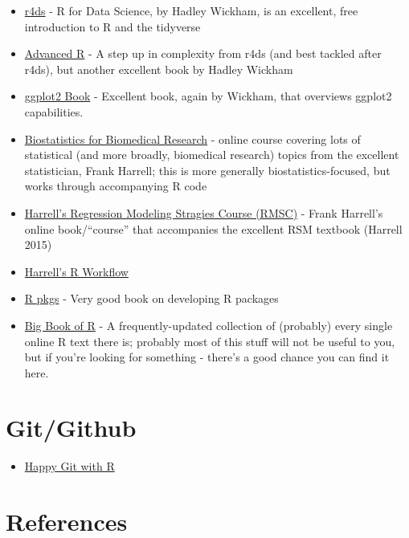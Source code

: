 \documentclass[
  letterpaper,
  DIV=11,
  numbers=noendperiod]{scrreprt}
\providecommand{\tightlist}{%
  \setlength{\itemsep}{0pt}\setlength{\parskip}{0pt}}\usepackage{longtable,booktabs,array}
\begin{document}
\begin{itemize}
\item
  \href{https://r4ds.hadley.nz/}{r4ds} - R for Data Science, by Hadley
  Wickham, is an excellent, free introduction to R and the tidyverse
\item
  \href{https://adv-r.hadley.nz/}{Advanced R} - A step up in complexity
  from r4ds (and best tackled after r4ds), but another excellent book by
  Hadley Wickham
\item
  \href{https://ggplot2-book.org/}{ggplot2 Book} - Excellent book, again
  by Wickham, that overviews ggplot2 capabilities.
\item
  \href{https://hbiostat.org/bbrc/}{Biostatistics for Biomedical
  Research} - online course covering lots of statistical (and more
  broadly, biomedical research) topics from the excellent statistician,
  Frank Harrell; this is more generally biostatistics-focused, but works
  through accompanying R code
\item
  \href{https://hbiostat.org/rmsc/}{Harrell's Regression Modeling
  Stragies Course (RMSC)} - Frank Harrell's online book/``course'' that
  accompanies the excellent RSM textbook (Harrell 2015)
\item
  \href{https://www.fharrell.com/post/rflow/}{Harrell's R Workflow}
\item
  \href{https://r-pkgs.org/}{R pkgs} - Very good book on developing R
  packages
\item
  \href{https://www.bigbookofr.com/}{Big Book of R} - A
  frequently-updated collection of (probably) every single online R text
  there is; probably most of this stuff will not be useful to you, but
  if you're looking for something - there's a good chance you can find
  it here.
\end{itemize}

\hypertarget{gitgithub}{%
\section{Git/Github}\label{gitgithub}}

\begin{itemize}
\tightlist
\item
  \href{https://happygitwithr.com/}{Happy Git with R}
\end{itemize}

\hypertarget{references-2}{%
\section*{References}\label{references-2}}
\end{document}
